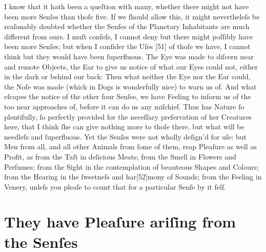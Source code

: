 \documentclass[letterpaper]{book}
\begin{document}
I know that it hath been a queſtion with many, whether there might not
have been more Senſes than thoſe five. If we ſhould allow this, it might
nevertheleſs be reaſonably doubted whether the Senſes of the Planetary
Inhabitants are much different from ours. I muſt confeſs, I cannot deny but
there might poſſibly have been more Senſes; but when I conſider the Uſes
[51] of thoſe we have, I cannot think but they would have been ſuperfluous.
The Eye was made to diſcern near and remote Objects, the Ear to give us
notice of what our Eyes could not, either in the dark or behind our back:
Then what neither the Eye nor the Ear could, the Noſe was made (which in
Dogs is wonderfully nice) to warn us of. And what eſcapes the notice of the
other four Senſes, we have Feeling to inform us of the too near approaches
of, before it can do us any miſchief. Thus has Nature ſo plentifully, ſo
perfectly provided for the neceſſary preſervation of her Creatures here, that
I think ſhe can give nothing more to thoſe there, but what will be needleſs
and ſuperfluous. Yet the Senſes were not wholly deſign'd for uſe: but Men
from all, and all other Animals from ſome of them, reap Pleaſure as well
as Profit, as from the Taſt in delicious Meats; from the Smell in Flowers
and Perfumes; from the Sight in the contemplation of beauteous Shapes
and Colours; from the Hearing in the ſweetneſs and har[52]mony of Sounds;
from the Feeling in Venery, unleſs you pleaſe to count that for a particular
Senſe by it ſelf.


\section{They have Pleaſure ariſing from the Senſes}
\end{document}
